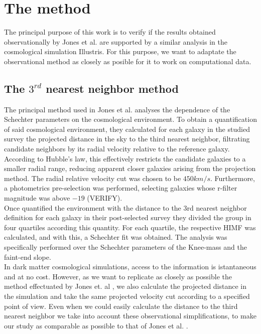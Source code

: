 \documentclass[a4paper,fleqn,usenatbib]{mnras}
\begin{document}
\section{The method}

The principal purpose of this work is to verify if the results obtained observationally by Jones et al. \cite{jones1} are supported by a similar analysis in the cosmological simulation Illustris. For this purpose, we want to adaptate the observational method as closely as posible for it to work on computational data.\\

\subsection{The $3^{rd}$ nearest neighbor method}

The principal method used in Jones et al. \cite{jones1} analyses the dependence of the Schechter parameters on the cosmological environment. To obtain a quantification of said cosmological environment, they calculated for each galaxy in the studied survey the projected distance in the sky to the third nearest neighbor, filtrating candidate neighbors by its radial velocity relative to the reference galaxy. According to Hubble's law, this effectively restricts the candidate galaxies to a smaller radial range, reducing apparent closer galaxies arising from the projection method. The radial relative velocity cut was chosen to be $450km/s$. Furthermore, a photometrics pre-selection was performed, selecting galaxies whose r-filter magnitude was above $-19$ (VERIFY).\\

Once quantified the environment with the distance to the 3rd nearest neighbor definition for each galaxy in their post-selected survey they divided the group in four quartiles according this quantity. For each quartile, the respective HIMF was calculated, and with this, a Schechter fit was obtained. The analysis was specifically performed over the Schechter parameters of the Knee-mass and the faint-end slope. \\

In dark matter cosmological simulations, access to the information is istantaneous and at no cost. However, as we want to replicate as closely as possible the method effectuated by Jones et. al \cite{jones1}, we also calculate the projected distance in the simulation and take the same projected velocity cut according to a specified point of view. Even when we could easily calculate the distance to the third nearest neighbor we take into account these observational simplifications, to make our study as comparable as possible to that of Jones et al. \cite{jones1}.\\
\end{document}
